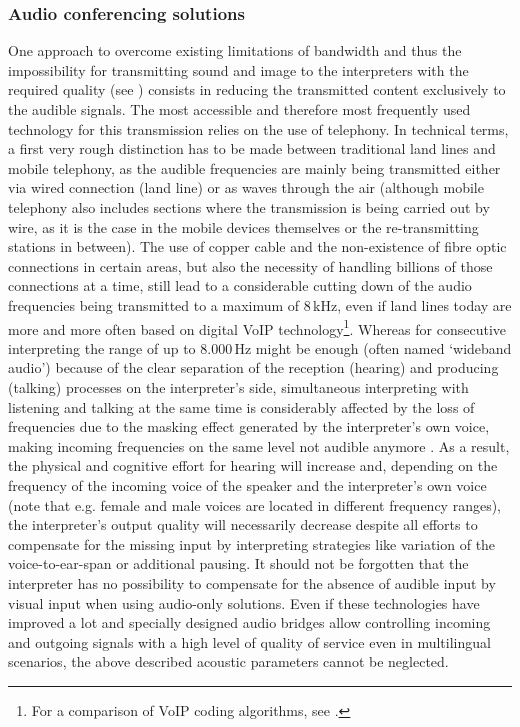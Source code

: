\documentclass[output=paper]{langsci/langscibook}
\begin{document}
\subsubsection{Audio conferencing solutions}
\label{sub:ziegler:4.3}
One approach to overcome existing limitations of bandwidth and thus the impossibility for transmitting sound and image to the interpreters with the required quality (see ) consists in reducing the transmitted content exclusively to the audible signals. The most accessible and therefore most frequently used technology for this transmission relies on the use of telephony. In technical terms, a first very rough distinction has to be made between traditional land lines and mobile telephony, as the audible frequencies are mainly being transmitted either via wired connection (land line) or as waves through the air (although mobile telephony also includes sections where the transmission is being carried out by wire, as it is the case in the mobile devices themselves or the re-transmitting stations in between). The use of copper cable and the non-existence of fibre optic connections in certain areas, but also the necessity of handling billions of those connections at a time, still lead to a considerable cutting down of the audio frequencies being transmitted to a maximum of 8\,kHz, even if land lines today are more and more often based on digital VoIP technology\footnote{For a comparison of VoIP coding algorithms, see \citet{Singh2016}.}. Whereas for consecutive interpreting the range of up to 8.000\,Hz might be enough (often named ‘wideband audio’) because of the clear separation of the reception (hearing) and producing (talking) processes on the interpreter’s side, simultaneous interpreting with listening and talking at the same time is considerably affected by the loss of frequencies due to the masking effect generated by the interpreter’s own voice, making incoming frequencies on the same level not audible anymore \citep{Jumpelt1984}. As a result, the physical and cognitive effort for hearing will increase and, depending on the frequency of the incoming voice of the speaker and the interpreter’s own voice (note that e.g. female and male voices are located in different frequency ranges), the interpreter’s output quality will necessarily decrease despite all efforts to compensate for the missing input by interpreting strategies like variation of the voice-to-ear-span or additional pausing. It should not be forgotten that the interpreter has no possibility to compensate for the absence of audible input by visual input when using audio-only solutions. Even if these technologies have improved a lot and specially designed audio bridges allow controlling incoming and outgoing signals with a high level of quality of service even in multilingual scenarios, the above described acoustic parameters cannot be neglected.
\end{document}
